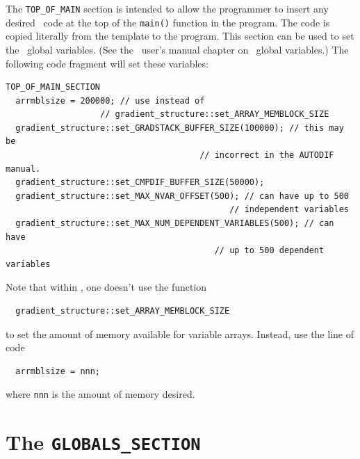 \documentclass{admbmanual}
\begin{document}
The \texttt{TOP\_OF\_MAIN} section is intended to allow the programmer to insert
any desired \cplus\ code at the top of the \texttt{main()} function in the
program. The code is copied literally from the template to the program. This
section can be used to set the \scAD\ global variables. (See the \scAD\ user's
manual chapter on \scAD\ global variables.) The following code fragment will set
these variables:
\begin{lstlisting}
TOP_OF_MAIN_SECTION
  arrmblsize = 200000; // use instead of
                   // gradient_structure::set_ARRAY_MEMBLOCK_SIZE
  gradient_structure::set_GRADSTACK_BUFFER_SIZE(100000); // this may be
                                       // incorrect in the AUTODIF manual.
  gradient_structure::set_CMPDIF_BUFFER_SIZE(50000);
  gradient_structure::set_MAX_NVAR_OFFSET(500); // can have up to 500
                                             // independent variables
  gradient_structure::set_MAX_NUM_DEPENDENT_VARIABLES(500); // can have
                                          // up to 500 dependent variables
\end{lstlisting}
%
{}
%
{}
%
{}
%
{}
%
{}

Note that within \ADM, one doesn't use the function
\begin{lstlisting}
  gradient_structure::set_ARRAY_MEMBLOCK_SIZE
\end{lstlisting}
to set the amount of memory available for variable arrays. Instead, use the line
of code
\begin{lstlisting}
  arrmblsize = nnn;
\end{lstlisting}
where \texttt{nnn} is the amount of memory desired.


\section{The \texttt{GLOBALS\_SECTION}}
\end{document}
